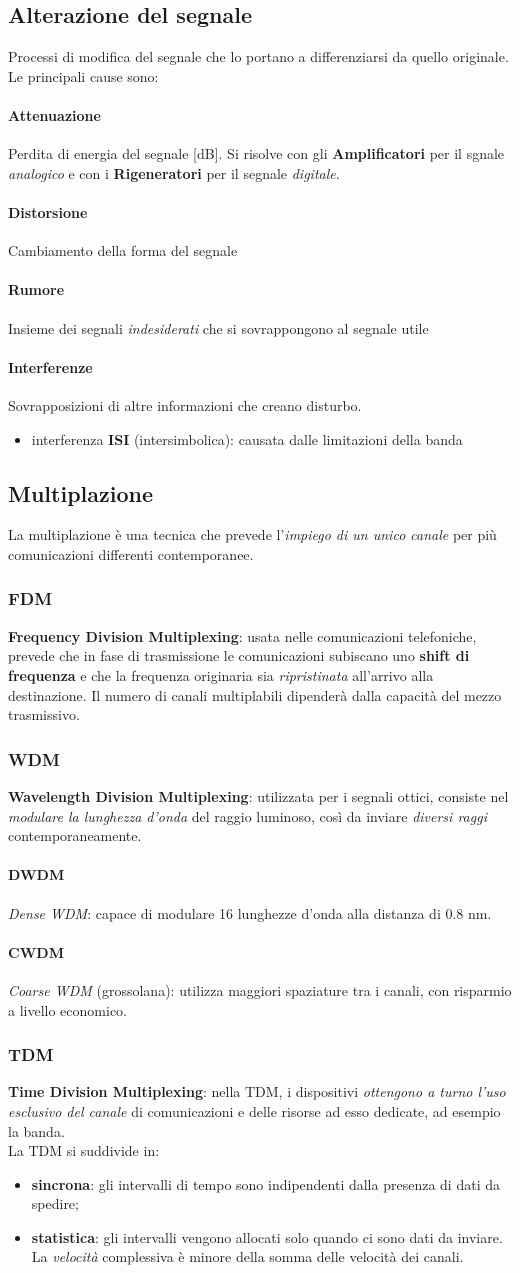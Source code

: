 \documentclass[a4paper,11pt]{article}
\def\subsub#1{\subsubsection{#1}\label{#1}}
\def\para#1{\paragraph{#1}\label{#1}}
\begin{document}
\subsection{Alterazione del segnale}
Processi di modifica del segnale che lo portano a differenziarsi da quello originale. Le principali cause sono:
\para{Attenuazione}
Perdita di energia del segnale [dB]. Si risolve con gli \textbf{Amplificatori} per il sgnale \textit{analogico} e con i \textbf{Rigeneratori} per il segnale \textit{digitale}.
\para{Distorsione}
Cambiamento della forma del segnale
\para{Rumore}
Insieme dei segnali \textit{indesiderati} che si sovrappongono al segnale utile
\para{Interferenze}
Sovrapposizioni di altre informazioni che creano disturbo.
\begin{itemize}
\item interferenza \textbf{ISI} (intersimbolica): causata dalle limitazioni della banda
\end{itemize}
\subsection{Multiplazione}
La multiplazione è una tecnica che prevede l'\textit{impiego di un unico canale }per più comunicazioni differenti contemporanee.
\subsub{FDM}
\textbf{Frequency Division Multiplexing}: usata nelle comunicazioni telefoniche, prevede che in fase di trasmissione le comunicazioni subiscano uno \textbf{shift di frequenza }e che la frequenza originaria sia \textit{ripristinata }all'arrivo alla destinazione. Il numero di canali multiplabili dipenderà dalla capacità del mezzo trasmissivo.
\subsub{WDM}
\textbf{Wavelength Division Multiplexing}: utilizzata per i segnali ottici, consiste nel \textit{modulare la lunghezza d'onda }del raggio luminoso, così da inviare \textit{diversi raggi }contemporaneamente.
\para{DWDM} \textit{Dense WDM}: capace di modulare 16 lunghezze d'onda alla distanza di 0.8 nm.
\para{CWDM} \textit{Coarse WDM }(grossolana): utilizza maggiori spaziature tra i canali, con risparmio a livello economico. 
\subsub{TDM}
\textbf{Time Division Multiplexing}: nella TDM, i dispositivi \textit{ottengono a turno l'uso esclusivo del canale }di comunicazioni e delle risorse ad esso dedicate, ad esempio la banda.\\
La TDM si suddivide in:
\begin{itemize}
\item \textbf{sincrona}: gli intervalli di tempo sono indipendenti dalla presenza di dati da spedire;
\item \textbf{statistica}: gli intervalli vengono allocati solo quando ci sono dati da inviare. La \textit{velocità }complessiva è minore della somma delle velocità dei canali.
\end{itemize}
\end{document}
